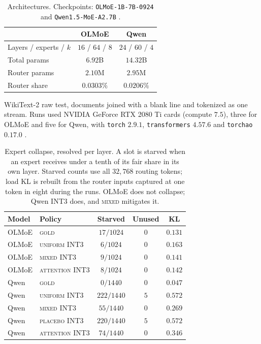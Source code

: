 \documentclass[11pt]{article}
\newcommand{\gold}{\textsc{gold}}
\newcommand{\uniform}{\textsc{uniform}}
\newcommand{\mixed}{\textsc{mixed}}
\newcommand{\placebo}{\textsc{placebo}}
\newcommand{\attn}{\textsc{attention}}
\begin{document}
\begin{table}[t]
\centering
\small
\setlength{\tabcolsep}{4pt}
\begin{tabular}{lcc}
\toprule
 & OLMoE & Qwen \\
\midrule
Layers / experts / $k$ & $16$ / $64$ / $8$ & $24$ / $60$ / $4$ \\
Total params & $6.92$B & $14.32$B \\
Router params & $2.10$M & $2.95$M \\
Router share & $0.0303\%$ & $0.0206\%$ \\
\bottomrule
\end{tabular}
\caption{Architectures.
  Checkpoints: \texttt{OLMoE-1B-7B-0924}
  \citep{muennighoff2024olmoe} and \texttt{Qwen1.5-MoE-A2.7B}
  \citep{qwen2024moe,qwen2023technical}.}
\label{tab:params}
\end{table}

WikiText-2 raw test, documents joined with a blank line and tokenized as
one stream.
Runs used NVIDIA GeForce RTX 2080 Ti cards (compute $7.5$), three for
OLMoE and five for Qwen, with \texttt{torch} $2.9.1$,
\texttt{transformers} $4.57.6$ and \texttt{torchao} $0.17.0$
\citep{or2025torchao,wolf2020transformers}.

\begin{table}[t]
\centering
\footnotesize
\setlength{\tabcolsep}{3pt}
\begin{tabular}{llccc}
\toprule
Model & Policy & Starved & Unused & KL \\
\midrule
OLMoE & \gold{} & $17/1024$ & $0$ & $0.131$ \\
OLMoE & \uniform{} INT3 & $6/1024$ & $0$ & $0.163$ \\
OLMoE & \mixed{} INT3 & $9/1024$ & $0$ & $0.141$ \\
OLMoE & \attn{} INT3 & $8/1024$ & $0$ & $0.142$ \\
Qwen & \gold{} & $0/1440$ & $0$ & $0.047$ \\
Qwen & \uniform{} INT3 & $222/1440$ & $5$ & $0.572$ \\
Qwen & \mixed{} INT3 & $55/1440$ & $0$ & $0.269$ \\
Qwen & \placebo{} INT3 & $220/1440$ & $5$ & $0.572$ \\
Qwen & \attn{} INT3 & $74/1440$ & $0$ & $0.346$ \\
\bottomrule
\end{tabular}
\caption{Expert collapse, resolved per layer. A slot is starved when an
  expert receives under a tenth of its fair share in its own layer.
  Starved counts use all $32{,}768$ routing tokens; load KL is rebuilt
  from the router inputs captured at one token in eight during the runs.
  OLMoE does not collapse; Qwen INT3 does, and
  \mixed{} mitigates it.}
\label{tab:collapse}
\end{table}
\end{document}

